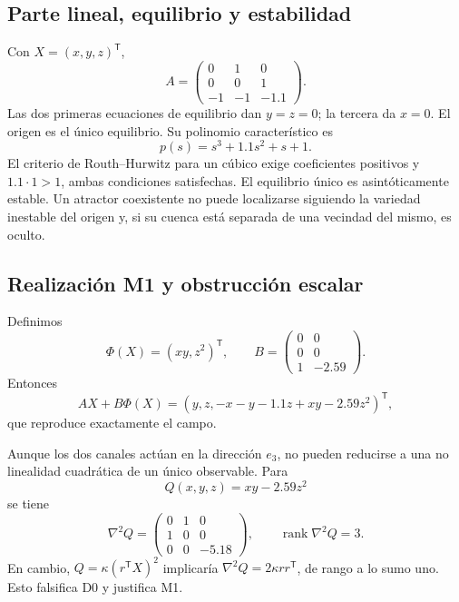 \subsection{Parte lineal, equilibrio y estabilidad}

Con \(X=(x,y,z)^{\mathsf T}\),
\begin{equation}
 A=\begin{pmatrix}
 0&1&0\\0&0&1\\-1&-1&-1.1
 \end{pmatrix}.
 \label{eq:cand-jerk-A}
\end{equation}
Las dos primeras ecuaciones de equilibrio dan \(y=z=0\); la tercera da
\(x=0\). El origen es el único equilibrio. Su polinomio característico es
\begin{equation}
 p(s)=s^3+1.1s^2+s+1.
 \label{eq:cand-jerk-charpoly}
\end{equation}
El criterio de Routh--Hurwitz para un cúbico exige coeficientes positivos y
\(1.1\cdot1>1\), ambas condiciones satisfechas. El equilibrio único es
asintóticamente estable. Un atractor coexistente no puede localizarse
siguiendo la variedad inestable del origen y, si su cuenca está separada de una
vecindad del mismo, es oculto.

\subsection{Realización M1 y obstrucción escalar}

Definimos
\[
 \Phi(X)=(xy,z^2)^{\mathsf T},\qquad
 B=\begin{pmatrix}0&0\\0&0\\1&-2.59\end{pmatrix}.
\]
Entonces
\[
 AX+B\Phi(X)=
 (y,z,-x-y-1.1z+xy-2.59z^2)^{\mathsf T},
\]
que reproduce exactamente el campo.

Aunque los dos canales actúan en la dirección \(e_3\), no pueden reducirse a
una no linealidad cuadrática de un único observable. Para
\[
 Q(x,y,z)=xy-2.59z^2
\]
se tiene
\begin{equation}
 \nabla^2Q=
 \begin{pmatrix}
 0&1&0\\1&0&0\\0&0&-5.18
 \end{pmatrix},
 \qquad \operatorname{rank}\nabla^2Q=3.
 \label{eq:cand-jerk-hessian}
\end{equation}
En cambio, \(Q=\kappa(r^{\mathsf T}X)^2\) implicaría
\(\nabla^2Q=2\kappa rr^{\mathsf T}\), de rango a lo sumo uno. Esto falsifica
D0 y justifica M1.

